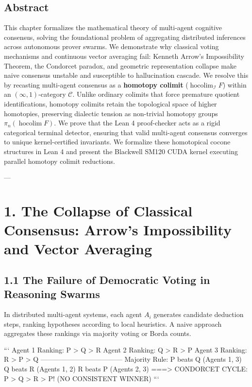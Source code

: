 \documentclass[11pt,twoside,openright]{amsbook}
\begin{document}
{{\subsection{Abstract}
This chapter formalizes the mathematical theory of multi-agent cognitive consensus, solving the foundational problem of aggregating distributed inferences across autonomous prover swarms. We demonstrate why classical voting mechanisms and continuous vector averaging fail: Kenneth Arrow’s Impossibility Theorem, the Condorcet paradox, and geometric representation collapse make naive consensus unstable and susceptible to hallucination cascade. We resolve this by recasting multi-agent consensus as a \textbf{homotopy colimit} ($\operatorname{hocolim}_{\mathcal{I}} F$) within an $(\infty, 1)$-category $\mathcal{C}$. Unlike ordinary colimits that force premature quotient identifications, homotopy colimits retain the topological space of higher homotopies, preserving dialectic tension as non-trivial homotopy groups $\pi_n(\operatorname{hocolim} F)$. We prove that the Lean 4 proof-checker acts as a rigid categorical terminal detector, ensuring that valid multi-agent consensus converges to unique kernel-certified invariants. We formalize these homotopical cocone structures in Lean 4 and present the Blackwell SM120 CUDA kernel executing parallel homotopy colimit reductions.

---

\section{1. The Collapse of Classical Consensus: Arrow’s Impossibility and Vector Averaging}

\subsection{1.1 The Failure of Democratic Voting in Reasoning Swarms}
In distributed multi-agent systems, each agent $A_i$ generates candidate deduction steps, ranking hypotheses according to local heuristics. A naive approach aggregates these rankings via majority voting or Borda counts.

```
       Agent 1 Ranking:   P > Q > R
       Agent 2 Ranking:   Q > R > P
       Agent 3 Ranking:   R > P > Q
       ------------------------------------
       Majority Rule:
         P beats Q (Agents 1, 3)
         Q beats R (Agents 1, 2)
         R beats P (Agents 2, 3)
       ===> CONDORCET CYCLE: P > Q > R > P! (NO CONSISTENT WINNER)
```

}}
\end{document}
